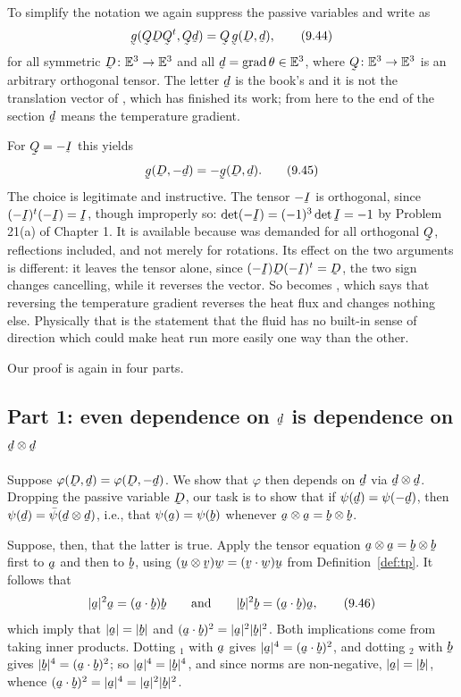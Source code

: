 To simplify the notation we again suppress the passive variables and
write  as
\begin{equation}
   \bg(\bQ\bD\bQ^{t},\bQ\bd)=\bQ\,\bg(\bD,\bd),
   \tag{9.44}\label{eq:9.44}
\end{equation}
for all symmetric $\bD\colon\Et\to\Et$ and all $\bd=\grad\theta\in\Et$,
where $\bQ\colon\Et\to\Et$ is an arbitrary orthogonal tensor. The letter
$\bd$ is the book's and it is not the translation vector of ,
which has finished its work; from here to the end of the section
$\bd$ means the temperature gradient.

For $\bQ=-\I$ this yields
\begin{equation}
   \bg(\bD,-\bd)=-\bg(\bD,\bd).
   \tag{9.45}\label{eq:9.45}
\end{equation}
The choice is legitimate and instructive. The tensor $-\I$ is
orthogonal, since $(-\I)^{t}(-\I)=\I$, though improperly so:
$\det(-\I)=(-1)^{3}\det\I=-1$ by Problem 21(a) of Chapter 1. It is
available because  was demanded for all orthogonal
$\bQ$, reflections included, and not merely for rotations. Its effect on
the two arguments is different: it leaves the tensor alone, since
$(-\I)\bD(-\I)^{t}=\bD$, the two sign changes cancelling, while it
reverses the vector. So  becomes , which says that
reversing the temperature gradient reverses the heat flux and changes
nothing else. Physically that is the statement that the fluid has no
built-in sense of direction which could make heat run more easily one
way than the other.

Our proof is again in four parts.

\subsection*{Part 1: even dependence on $\bd$ is dependence on
$\bd\otimes\bd$}

Suppose $\varphi(\bD,\bd)=\varphi(\bD,-\bd)$. We show that $\varphi$
then depends on $\bd$ via $\bd\otimes\bd$. Dropping the passive variable
$\bD$, our task is to show that if $\psi(\bd)=\psi(-\bd)$, then
$\psi(\bd)=\bar\psi(\bd\otimes\bd)$, i.e., that $\psi(\ba)=\psi(\bb)$
whenever $\ba\otimes\ba=\bb\otimes\bb$.

Suppose, then, that the latter is true. Apply the tensor equation
$\ba\otimes\ba=\bb\otimes\bb$ first to $\ba$ and then to $\bb$, using
$(\bu\otimes\bv)\bw=(\ip\bv\bw)\bu$ from Definition~\ref{def:tp}. It
follows that
\begin{equation}
   |\ba|^{2}\ba=(\ip\ba\bb)\bb
   \qquad\text{and}\qquad
   |\bb|^{2}\bb=(\ip\ba\bb)\ba,
   \tag{9.46}\label{eq:9.46}
\end{equation}
which imply that $|\ba|=|\bb|$ and $(\ip\ba\bb)^{2}=|\ba|^{2}|\bb|^{2}$.
Both implications come from taking inner products. Dotting
$_{1}$ with $\ba$ gives $|\ba|^{4}=(\ip\ba\bb)^{2}$, and
dotting $_{2}$ with $\bb$ gives $|\bb|^{4}=(\ip\ba\bb)^{2}$;
so $|\ba|^{4}=|\bb|^{4}$, and since norms are non-negative,
$|\ba|=|\bb|$, whence $(\ip\ba\bb)^{2}=|\ba|^{4}=|\ba|^{2}|\bb|^{2}$.

